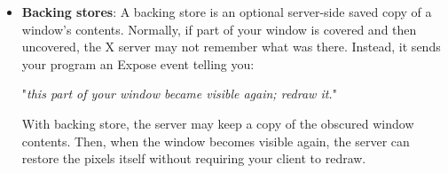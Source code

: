 \documentclass{report}
\begin{document}
\begin{itemize}
            \bigbreak \noindent 
            \begin{cppcode}
                BitmapPad (display)
                int XBitmapPad (display)
            \end{cppcode}
            \bigbreak \noindent 
            Each scanline must be padded to a multiple of bits returned by this macro or function.
            \bigbreak \noindent 
            \begin{cppcode}
            DisplayHeight(display, screen_number)
            int XDisplayHeight(display, screen_number)
            \end{cppcode}
            \bigbreak \noindent 
            Both return an integer that describes the height of the screen in pixels.
            \bigbreak \noindent 
            \begin{cppcode}
                DisplayHeightMM (display, screen_number)
                int XDisplayHeightMM(display, screen_number)
            \end{cppcode}
            \bigbreak \noindent 
            Both return the height of the specified screen in millimeters.
            \bigbreak \noindent 
            \begin{cppcode}
                DisplayWidth (display, screen_number)
                int XDisplayWidth (display, screen_number)
            \end{cppcode}
            \bigbreak \noindent 
            Both return the width of the screen in pixels.
            \bigbreak \noindent 
            \begin{cppcode}
                DisplayWidthMM (display, screen_number)
                int XDisplayWidthMM (display, screen_number)
            \end{cppcode}
            \bigbreak \noindent 
            Both return the width of the specified screen in millimeters.
        \item \textbf{Backing stores}: A backing store is an optional server-side saved copy of a window’s contents.
            \bigbreak \noindent 
            Normally, if part of your window is covered and then uncovered, the X server may not remember what was there. Instead, it sends your program an Expose event telling you:
            \begin{center}
                "\textit{this part of your window became visible again; redraw it.}"
            \end{center}
            With backing store, the server may keep a copy of the obscured window contents. Then, when the window becomes visible again, the server can restore the pixels itself without requiring your client to redraw.

\end{itemize}
\end{document}
